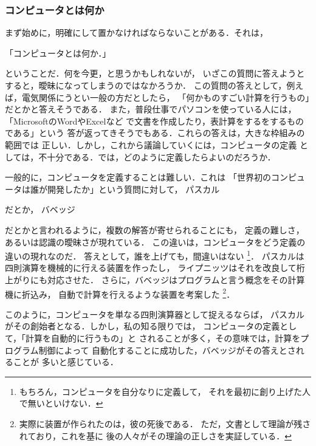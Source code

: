         \subsubsection{コンピュータとは何か}
            まず始めに，明確にして置かなければならないことがある．それは，
                \begin{center}
                    「コンピュータとは何か．」
                \end{center}
            ということだ．何を今更，と思うかもしれないが，
            いざこの質問に答えようとすると，曖昧になってしまうのではなかろうか．
            この質問の答えとして，例えば，電気関係にうとい一般の方だとしたら，
            「何かものすごい計算を行うもの」だとかと答えそうである．
            また，普段仕事でパソコンを使っている人には，
            「MicrosoftのWordやExcelなど
            で文書を作成したり，表計算をするをするものである」という
            答が返ってきそうでもある．これらの答えは，大きな枠組みの範囲では
            正しい．しかし，これから議論していくには，コンピュータの定義
            としては，不十分である．では，どのように定義したらよいのだろうか．

            一般的に，コンピュータを定義することは難しい．これは
            「世界初のコンピュータは誰が開発したか」という質問に対して，
            パスカル

            だとか，
            バベッジ

            だとかと言われるように，複数の解答が寄せられることにも，
            定義の難しさ，あるいは認識の曖昧さが現れている．
            この違いは，コンピュータをどう定義の違いの現れなのだ．
            答えとして，誰を上げても，間違いはない
                \footnote{
                    もちろん，コンピュータを自分なりに定義して，
                    それを最初に創り上げた人で無いといけない．
                }．
            パスカルは四則演算を機械的に行える装置を作ったし，
            ライプニッツはそれを改良して桁上がりにも対応させた．
            さらに，バベッジはプログラムと言う概念をその計算機に折込み，
            自動で計算を行えるような装置を考案した
                \footnote{
                    実際に装置が作られたのは，彼の死後である．
                    ただ，文書として理論が残されており，これを基に
                    後の人々がその理論の正しさを実証している．
                }．

            このように，コンピュータを単なる四則演算器として捉えるならば，
            パスカルがその創始者となる．しかし，私の知る限りでは，
            コンピュータの定義として，「計算を自動的に行うもの」と
            されることが多く，その意味では，計算をプログラム制御によって
            自動化することに成功した，バベッジがその答えとされることが
            多いと感じている．

